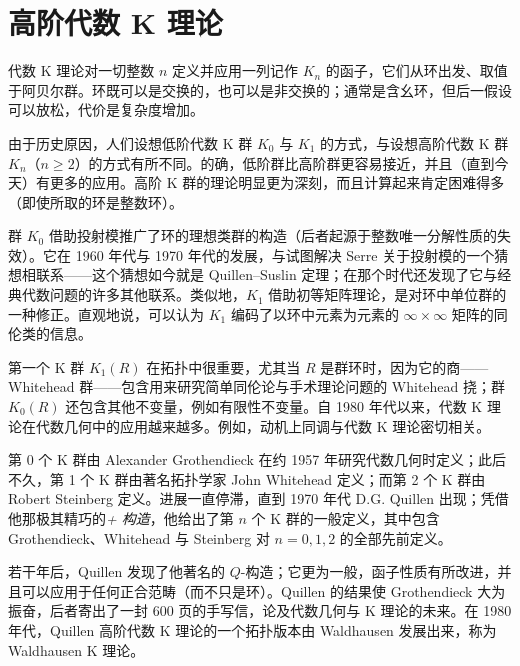 
\section{高阶代数 K 理论}

代数 K 理论对一切整数 $n$ 定义并应用一列记作 $K_n$ 的函子，它们从环出发、取值于阿贝尔群。环既可以是交换的，也可以是非交换的；通常是含幺环，但后一假设可以放松，代价是复杂度增加。

由于历史原因，人们设想低阶代数 K 群 $K_0$ 与 $K_1$ 的方式，与设想高阶代数 K 群 $K_n$（$n \ge 2$）的方式有所不同。的确，低阶群比高阶群更容易接近，并且（直到今天）有更多的应用。高阶 K 群的理论明显更为深刻，而且计算起来肯定困难得多（即使所取的环是整数环）。

群 $K_0$ 借助投射模推广了环的理想类群的构造（后者起源于整数唯一分解性质的失效）。它在 1960 年代与 1970 年代的发展，与试图解决 Serre 关于投射模的一个猜想相联系——这个猜想如今就是 Quillen--Suslin 定理；在那个时代还发现了它与经典代数问题的许多其他联系。类似地，$K_1$ 借助初等矩阵理论，是对环中单位群的一种修正。直观地说，可以认为 $K_1$ 编码了以环中元素为元素的 $\infty \times \infty$ 矩阵的同伦类的信息。

第一个 K 群 $K_1(R)$ 在拓扑中很重要，尤其当 $R$ 是群环时，因为它的商——Whitehead 群——包含用来研究简单同伦论与手术理论问题的 Whitehead 挠；群 $K_0(R)$ 还包含其他不变量，例如有限性不变量。自 1980 年代以来，代数 K 理论在代数几何中的应用越来越多。例如，动机上同调与代数 K 理论密切相关。

第 0 个 K 群由 Alexander Grothendieck 在约 1957 年研究代数几何时定义；此后不久，第 1 个 K 群由著名拓扑学家 John Whitehead 定义；而第 2 个 K 群由 Robert Steinberg 定义。进展一直停滞，直到 1970 年代 D.G. Quillen 出现；凭借他那极其精巧的\emph{+ 构造}，他给出了第 $n$ 个 K 群的一般定义，其中包含 Grothendieck、Whitehead 与 Steinberg 对 $n = 0, 1, 2$ 的全部先前定义。

若干年后，Quillen 发现了他著名的 $Q$-构造；它更为一般，函子性质有所改进，并且可以应用于任何正合范畴（而不只是环）。Quillen 的结果使 Grothendieck 大为振奋，后者寄出了一封 600 页的手写信，论及代数几何与 K 理论的未来。在 1980 年代，Quillen 高阶代数 K 理论的一个拓扑版本由 Waldhausen 发展出来，称为 Waldhausen K 理论。

